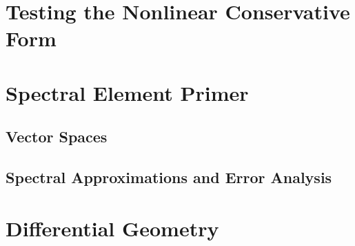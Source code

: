 \documentclass{softwaremanual}
\begin{document}




\chapter{Testing the Nonlinear Conservative Form}



\clearpage

\appendix

\chapter{Spectral Element Primer}

\section{Vector Spaces}


\section{Spectral Approximations and Error Analysis}

\chapter{Differential Geometry}

\pagebreak



\end{document}

